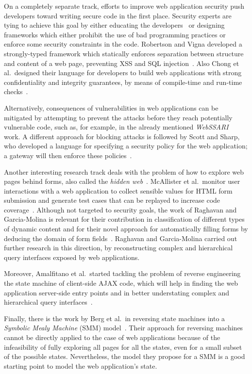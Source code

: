 On a completely separate track, efforts to improve web application
security push developers toward writing secure code in the first
place. Security experts are tying to achieve this goal by either
educating the developers~\cite{spi02:complete} or designing frameworks
which either prohibit the use of bad programming practices or enforce
some security constraints in the code. Robertson and Vigna developed a
strongly-typed framework which statically enforces separation between
structure and content of a web page, preventing XSS and SQL
injection~\cite{robertson09}. Also Chong et al.\ designed their
language for developers to build web applications with strong
confidentiality and integrity guarantees, by means of compile-time and
run-time checks~\cite{chong07}.

Alternatively, consequences of vulnerabilities in web applications can
be mitigated by attempting to prevent the attacks before they reach
potentially vulnerable code, such as, for example, in the already
mentioned \emph{WebSSARI}~\cite{huang04:securing} work. A different
approach for blocking attacks is followed by Scott and Sharp, who
developed a language for specifying a security policy for the web
application; a gateway will then enforce these
policies~\cite{scott02}.

Another interesting research track deals with the problem of how to
explore web pages behind forms, also called the \emph{hidden
  web}~\cite{raghavan01:hidden-web}. McAllister et al.\ monitor user
interactions with a web application to collect sensible values for
HTML form submission and generate test cases that can be replayed to
increase code coverage~\cite{mcallister08}. Although not targeted to
security goals, the work of Raghavan and Garcia-Molina is relevant for
their contribution in classification of different types of dynamic
content and for their novel approach for automatically filling forms
by deducing the domain of form fields~\cite{raghavan01:hidden-web}.
Raghavan and Garcia-Molina carried out further research in this
direction, by reconstructing complex and hierarchical query interfaces
exposed by web applications.

Moreover, Amalfitano et al.\ started tackling the problem of reverse
engineering the state machine of client-side AJAX code, which will
help in finding the web application server-side entry points and in
better understating complex and hierarchical query
interfaces~\cite{amalfitano08}.

Finally, there is the work by Berg et al.\ in reversing state machines
into a \emph{Symbolic Mealy Machine} (SMM) model~\cite{berg08}. Their
approach for reversing machines cannot be directly applied to the case
of web applications because of the infeasibility of fully exploring
all pages for all the states, even for a small subset of the possible
states. Nevertheless, the model they propose for a SMM is a good
starting point to model the web application's state.

